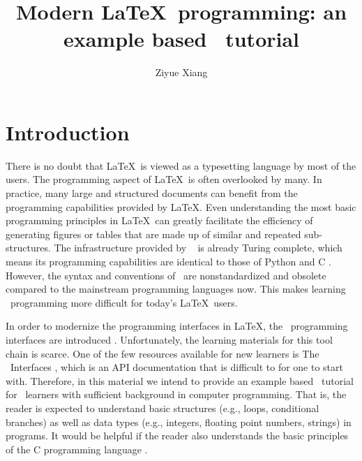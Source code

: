 \documentclass{ltugboat}
\title{Modern \LaTeX~programming: an example based \liii~tutorial}
\author{Ziyue Xiang}
\begin{document}
\begin{abstract}

\end{abstract}

\maketitle

\tableofcontents
\ListOfCodeExample


\section{Introduction}

There is no doubt that \LaTeX~is viewed as a typesetting language by most of the users.
The programming aspect of \LaTeX~is often overlooked by many.
In practice, many large and structured documents can benefit from the programming capabilities provided by \LaTeX. 
Even understanding the most basic programming principles in \LaTeX~can greatly facilitate the efficiency of generating figures or tables that are made up of similar and repeated sub-structures.
The infrastructure provided by \LaTeXe\ \cite{berry2017latex} is already Turing complete, which means its programming capabilities are identical to those of Python \cite{vanrossum2010python} and C \cite{ritchie1988c}.
However, the syntax and conventions of \LaTeXe~are nonstandardized and obsolete compared to the mainstream programming languages now.
This makes learning \LaTeXe~programming more difficult for today's \LaTeX~users.


In order to modernize the programming interfaces in \LaTeX, the \liii~programming interfaces are introduced \cite{mittelbach2020quo}.
Unfortunately, the learning materials for this tool chain is scarce.
One of the few resources available for new learners is The \liii\ Interfaces \cite{l3interface}, which is an API documentation that is difficult to for one to start with.
Therefore, in this material we intend to provide an example based \liii~tutorial for \liii~learners with sufficient background in computer programming.
That is, the reader is expected to understand basic structures (e.g., loops, conditional branches) as well as data types (e.g., integers, floating point numbers, strings) in programs. 
It would be helpful if the reader also understands the basic principles of the C programming language \cite{ritchie1988c}.
\end{document}
